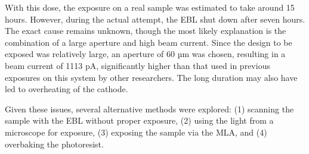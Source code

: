 With this dose, the exposure on a real sample was estimated to take around 15 hours. However, during the actual attempt, the EBL shut down after seven hours. The exact cause remains unknown, though the most likely explanation is the combination of a large aperture and high beam current. Since the design to be exposed was relatively large, an aperture of 60 µm was chosen, resulting in a beam current of 1113 pA, significantly higher than that used in previous exposures on this system by other researchers. The long duration may also have led to overheating of the cathode.

Given these issues, several alternative methods were explored: (1) scanning the sample with the EBL without proper exposure, (2) using the light from a microscope for exposure, (3) exposing the sample via the MLA, and (4) overbaking the photoresist.

